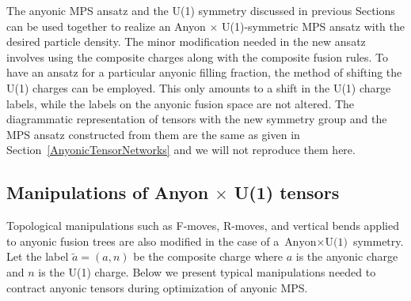 \documentclass[aps,reprint,superscriptaddress,amsmath,amssymb,amsfonts,prb]{revtex4-1}
\begin{document}
The anyonic MPS ansatz and the U(1) symmetry discussed in previous Sections can be used together to realize an Anyon $\times$ U(1)-symmetric MPS ansatz with the desired particle density. The minor modification needed in the new ansatz involves using the composite charges along with the composite fusion rules. To have an ansatz for a particular anyonic filling fraction, the method of shifting the U(1) charges can be employed. This only amounts to a shift in the U(1) charge labels, while the labels on the anyonic fusion space are not altered. The diagrammatic representation of tensors with the new symmetry group and the MPS ansatz constructed from them are the same as given in Section~\ref{AnyonicTensorNetworks} and we will not reproduce them here.


\subsection{Manipulations of Anyon $\times$ U(1) tensors}
Topological manipulations such as F-moves, R-moves, and vertical bends applied to anyonic fusion trees are also modified in the case of a $\text{Anyon}\times \text{U(1)}$ symmetry. Let the label $\tilde{a} = (a, n)$ be the composite charge where $a$ is the anyonic charge and $n$ is the U(1) charge. Below we present typical manipulations needed to contract anyonic tensors during optimization of anyonic MPS. 
\end{document}
